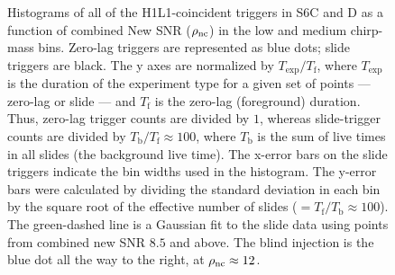 \begin{figure}[p]
\center
{}
\caption{Histograms of all of the H1L1-coincident triggers in S6C and D as a function of
combined New SNR ($\rho_{\mathrm{nc}}$) in the low and medium chirp-mass bins. Zero-lag
triggers are represented as blue dots; slide triggers are black. The y axes are
normalized by $T_{\mathrm{exp}}/T_{\mathrm{f}}$, where $T_{\mathrm{exp}}$ is
the duration of the experiment type for a given set of points --- zero-lag or
slide --- and $T_{\mathrm{f}}$ is the zero-lag (foreground) duration. Thus,
zero-lag trigger counts are divided by $1$, whereas slide-trigger counts are
divided by $T_{\mathrm{b}}/T_{\mathrm{f}} \approx 100$, where $T_{\mathrm{b}}$
is the sum of live times in all slides (the background live time). The x-error
bars on the slide triggers indicate the bin widths used in the histogram. The
y-error bars were calculated by dividing the standard deviation in each bin by
the square root of the effective number of slides ($=
T_{\mathrm{f}}/T_{\mathrm{b}} \approx 100$). The green-dashed line is a
Gaussian fit to the slide data using points from combined new SNR $8.5$ and
above. The blind injection is the blue dot all the way to the right, at
$\rho_{\mathrm{nc}} \approx 12$.}
\label{fig:big_dog-non_cum_hist-extrap}
\end{figure}

